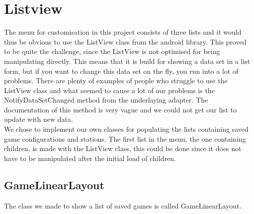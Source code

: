 
\section{Listview}
The menu for customisation in this project consists of three lists and it would thus be obvious to use the ListView class from the android library\citep{androidlistview}. This proved to be quite the challenge, since the ListView is not optimised for being manipulating directly. This means that it is build for showing a data set in a list form, but if you want to change this data set on the fly, you run into a lot of problems. There are plenty of examples of people who struggle to use the ListView class\citep{listviewfail} and what seemed to cause a lot of our problems is the NotifyDataSetChanged method from the underlaying adapter\citep{notifydatasetchanged}. The documentation of this method is very vague and we could not get our list to update with new data.\\
We chose to implement our own classes for populating the lists containing saved game configurations and stations. The first list in the menu, the one containing children, is made with the ListView class, this could be done since it does not have to be manipulated after the initial load of children.
\subsection*{GameLinearLayout}
The class we made to show a list of saved games is called GameLinearLayout.\\

